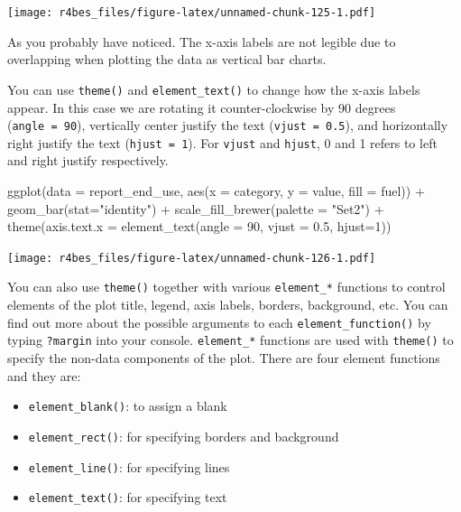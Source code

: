 \documentclass[
]{book}
\newenvironment{Shaded}{\begin{snugshade}}{\end{snugshade}}
\newcommand{\AttributeTok}[1]{\textcolor[rgb]{0.77,0.63,0.00}{#1}}
\newcommand{\DecValTok}[1]{\textcolor[rgb]{0.00,0.00,0.81}{#1}}
\newcommand{\FloatTok}[1]{\textcolor[rgb]{0.00,0.00,0.81}{#1}}
\newcommand{\FunctionTok}[1]{\textcolor[rgb]{0.00,0.00,0.00}{#1}}
\newcommand{\NormalTok}[1]{#1}
\newcommand{\SpecialCharTok}[1]{\textcolor[rgb]{0.00,0.00,0.00}{#1}}
\newcommand{\StringTok}[1]{\textcolor[rgb]{0.31,0.60,0.02}{#1}}
\providecommand{\tightlist}{%
  \setlength{\itemsep}{0pt}\setlength{\parskip}{0pt}}
\begin{document}
\texttt{[image: r4bes\_files/figure-latex/unnamed-chunk-125-1.pdf]}

As you probably have noticed. The x-axis labels are not legible due to overlapping when plotting the data as vertical bar charts.

You can use \texttt{theme()} and \texttt{element\_text()} to change how the x-axis labels appear. In this case we are rotating it counter-clockwise by 90 degrees (\texttt{angle\ =\ 90}), vertically center justify the text (\texttt{vjust\ =\ 0.5}), and horizontally right justify the text (\texttt{hjust\ =\ 1}). For \texttt{vjust} and \texttt{hjust}, 0 and 1 refers to left and right justify respectively.

\begin{Shaded}
\begin{Highlighting}[]
\FunctionTok{ggplot}\NormalTok{(}\AttributeTok{data =}\NormalTok{ report\_end\_use, }\FunctionTok{aes}\NormalTok{(}\AttributeTok{x =}\NormalTok{ category, }\AttributeTok{y =}\NormalTok{ value, }\AttributeTok{fill =}\NormalTok{ fuel)) }\SpecialCharTok{+}
    \FunctionTok{geom\_bar}\NormalTok{(}\AttributeTok{stat=}\StringTok{"identity"}\NormalTok{) }\SpecialCharTok{+} 
    \FunctionTok{scale\_fill\_brewer}\NormalTok{(}\AttributeTok{palette =} \StringTok{"Set2"}\NormalTok{) }\SpecialCharTok{+}
    \FunctionTok{theme}\NormalTok{(}\AttributeTok{axis.text.x =} \FunctionTok{element\_text}\NormalTok{(}\AttributeTok{angle =} \DecValTok{90}\NormalTok{, }\AttributeTok{vjust =} \FloatTok{0.5}\NormalTok{, }\AttributeTok{hjust=}\DecValTok{1}\NormalTok{))}
\end{Highlighting}
\end{Shaded}

\texttt{[image: r4bes\_files/figure-latex/unnamed-chunk-126-1.pdf]}

You can also use \texttt{theme()} together with various \texttt{element\_*} functions to control elements of the plot title, legend, axis labels, borders, background, etc. You can find out more about the possible arguments to each \texttt{element\_function()} by typing \texttt{?margin} into your console. \texttt{element\_*} functions are used with \texttt{theme()} to specify the non-data components of the plot. There are four element functions and they are:

\begin{itemize}
\tightlist
\item
  \texttt{element\_blank()}: to assign a blank
\item
  \texttt{element\_rect()}: for specifying borders and background
\item
  \texttt{element\_line()}: for specifying lines
\item
  \texttt{element\_text()}: for specifying text
\end{itemize}
\end{document}
